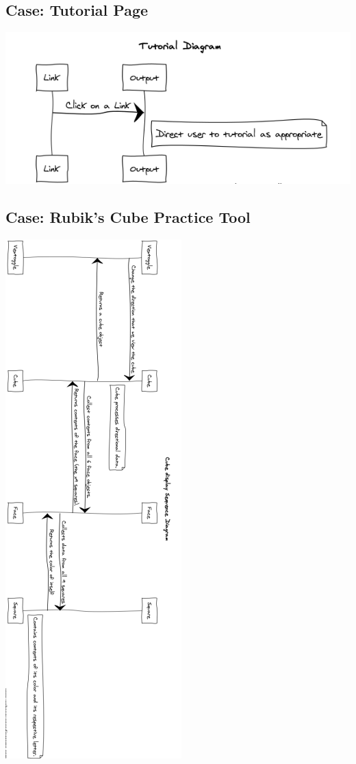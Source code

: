 \documentclass[12pt]{article}
\begin{document}
	\subsection{Case: Tutorial Page}
	\includegraphics[width = .5\textwidth]{tut.PNG}
	\subsection{Case: Rubik's Cube Practice Tool}
	\includegraphics[width = .5\textwidth]{sequence.PNG}
\end{document}
